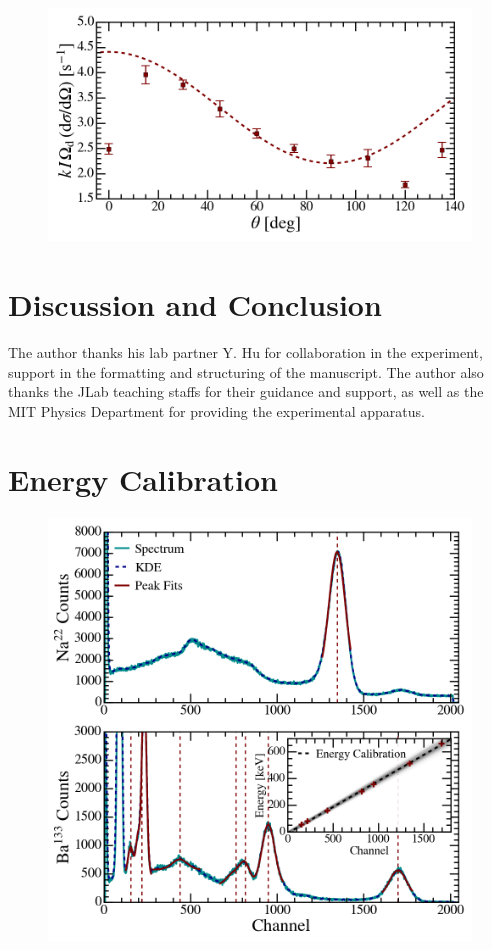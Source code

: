\documentclass[aps,twocolumn,secnumarabic,balancelastpage,amsmath,amssymb,nofootinbib,floatfix]{revtex4-1}
\begin{document}
\begin{figure}
    \centering
    \includegraphics[width=0.49 \textwidth]{Figures/scattering_rate.png}
    \caption{}
    \label{fig:scattering_rate}
\end{figure}


\section{Discussion and Conclusion}
\label{sec:conclusion}




\begin{acknowledgments}

The author thanks his lab partner  Y. Hu for collaboration in the experiment, support in the formatting and structuring of the manuscript. The author also thanks the JLab teaching staffs for their guidance and support, as well as the MIT Physics Department for providing the experimental apparatus.

\end{acknowledgments}





\appendix

\section{Energy Calibration}
\label{app:energy_calibration}

\begin{figure}
    \centering
    \includegraphics[width=0.49 \textwidth]{Figures/energy_calibration.png}
    \caption{}
    \label{fig:energy_calibration}
\end{figure}
\end{document}
